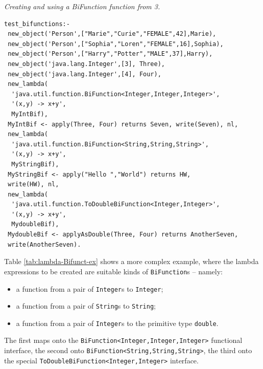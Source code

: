 \begin{table} %
\caption{\emph{Creating and using a BiFunction function from \tuprolog{} 3.}}
{}
\begin{lstlisting}[language=tuProlog,
	caption={},
	label={tab:lambda-Bifunct-ex}]
test_bifunctions:-
 new_object('Person',["Marie","Curie","FEMALE",42],Marie),
 new_object('Person',["Sophia","Loren","FEMALE",16],Sophia),
 new_object('Person',["Harry","Potter","MALE",37],Harry),
 new_object('java.lang.Integer',[3], Three),
 new_object('java.lang.Integer',[4], Four),
 new_lambda(
  'java.util.function.BiFunction<Integer,Integer,Integer>',
  '(x,y) -> x+y', 
  MyIntBif),
 MyIntBif <- apply(Three, Four) returns Seven, write(Seven), nl,
 new_lambda(
  'java.util.function.BiFunction<String,String,String>',
  '(x,y) -> x+y', 
  MyStringBif),
 MyStringBif <- apply("Hello ","World") returns HW,
 write(HW), nl,
 new_lambda(
  'java.util.function.ToDoubleBiFunction<Integer,Integer>',
  '(x,y) -> x+y', 
  MydoubleBif),
 MydoubleBif <- applyAsDouble(Three, Four) returns AnotherSeven,
 write(AnotherSeven).
\end{lstlisting}
\end{table}

Table \ref{tab:lambda-Bifunct-ex} shows a more complex example, where the lambda expressions to be created are suitable kinds of \texttt{BiFunction}s -- namely:
\begin{itemize}
 \item a function from a pair of \texttt{Integer}s to \texttt{Integer};
 \item a function from a pair of \texttt{String}s to \texttt{String};
 \item a function from a pair of \texttt{Integer}s to the primitive type \texttt{double}.
 \end{itemize}
\noindent The first maps onto the \texttt{BiFunction<Integer,Integer,Integer>} functional interface, the second onto \texttt{BiFunction<String,String,String>}, the third onto the special \texttt{ToDoubleBiFunction<Integer,Integer>} interface.


